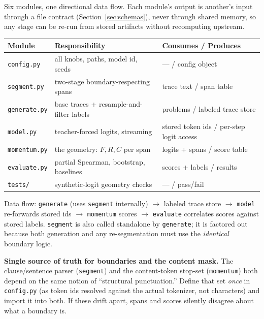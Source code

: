 \documentclass[11pt]{article}
\newcommand{\modu}[1]{\texttt{#1}}
\begin{document}
Six modules, one directional data flow. Each module's output is another's input through a file contract (Section~\ref{sec:schemas}), never through shared memory, so any stage can be re-run from stored artifacts without recomputing upstream.

\begin{center}
\begin{tabular}{@{}l l p{}@{}}
\toprule
\textbf{Module} & \textbf{Responsibility} & \textbf{Consumes / Produces} \\
\midrule
\modu{config.py}    & all knobs, paths, model id, seeds & --- / config object \\
\modu{segment.py}   & two-stage boundary-respecting spans & trace text / span table \\
\modu{generate.py}  & base traces + resample-and-filter labels & problems / labeled trace store \\
\modu{model.py}     & teacher-forced logits, streaming & stored token ids / per-step logit access \\
\modu{momentum.py}  & the geometry: $F,R,C$ per span & logits + spans / score table \\
\modu{evaluate.py}  & partial Spearman, bootstrap, baselines & scores + labels / results \\
\modu{tests/}       & synthetic-logit geometry checks & --- / pass/fail \\
\bottomrule
\end{tabular}
\end{center}

Data flow: \modu{generate} (uses \modu{segment} internally) $\rightarrow$ labeled trace store $\rightarrow$ \modu{model} re-forwards stored ids $\rightarrow$ \modu{momentum} scores $\rightarrow$ \modu{evaluate} correlates scores against stored labels. \modu{segment} is also called standalone by \modu{generate}; it is factored out because both generation and any re-segmentation must use the \emph{identical} boundary logic.

\begin{notebox}
\textbf{Single source of truth for boundaries and the content mask.} The clause/sentence parser (\modu{segment}) and the content-token stop-set (\modu{momentum}) both depend on the same notion of ``structural punctuation.'' Define that set \emph{once} in \modu{config.py} (as token ids resolved against the actual tokenizer, not characters) and import it into both. If these drift apart, spans and scores silently disagree about what a boundary is.
\end{notebox}
\end{document}
